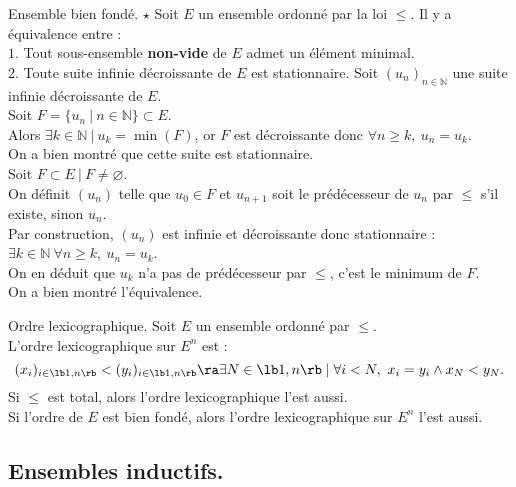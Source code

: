 \documentclass[french, 11pt]{article}
\begin{document}
\begin{prop}{Ensemble bien fondé. $\star$}{}
    Soit $E$ un ensemble ordonné par la loi $\leq$. Il y a équivalence entre :\\
    \hspace*{2em}$1.$ Tout sous-ensemble \textbf{non-vide} de $E$ admet un élément minimal.\\
    \hspace*{2em}$2.$ Toute suite infinie décroissante de $E$ est stationnaire.
    \tcblower
    \fbox{$\ra$} Soit $(u_n)_{n\in\mathbb{N}}$ une suite infinie décroissante de $E$.\\
    Soit $F=\{u_n ~ | ~ n \in \mathbb{N}\}\subset E$.\\
    Alors $\exists k \in \mathbb{N} ~ | ~ u_k = \min(F)$, or $F$ est décroissante donc $\forall n \geq k, ~ u_n = u_k$.\\
    On a bien montré que cette suite est stationnaire.\\[0.2cm]
    \fbox{$\la$} Soit $F\subset E ~ | ~ F \neq \varnothing$.\\
    On définit $(u_n)$ telle que $u_0 \in F$ et $u_{n+1}$ soit le prédécesseur de $u_n$ par $\leq$ s'il existe, sinon $u_n$.\\
    Par construction, $(u_n)$ est infinie et décroissante donc stationnaire : $\exists k \in \mathbb{N} ~ \forall n \geq k, ~ u_n = u_k$.\\
    On en déduit que $u_k$ n'a pas de prédécesseur par $\leq$, c'est le minimum de $F$.\\
    On a bien montré l'équivalence.
\end{prop}

\pagebreak

\begin{prop}{Ordre lexicographique.}{}
    Soit $E$ un ensemble ordonné par $\leq$.\\
    L'ordre lexicographique sur $E^n$ est :
    \begin{equation*}
        (x_i)_{i\in\lb1,n\rb} < (y_i)_{i\in\lb1,n\rb} \ra \exists N \in \lb1,n\rb \mid \forall i < N, ~ x_i = y_i \land x_N < y_N.
    \end{equation*}
    Si $\leq$ est total, alors l'ordre lexicographique l'est aussi.\\
    Si l'ordre de $E$ est bien fondé, alors l'ordre lexicographique sur $E^n$ l'est aussi.
\end{prop}

\subsection{Ensembles inductifs.}{}
\end{document}
